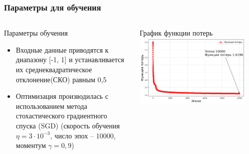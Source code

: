 \begin{frame}[t]
    \frametitle{Параметры для обучения}
    \begin{columns}[T]
    \begin{block}{\centering Параметры обучения}                
        \begin{itemize}\small
            \item Входные данные приводятся к диапазону [-1, 1] и устанавливается их
            среднеквадратическое отклонение(СКО) равным 0,5
            \item Оптимизация производилась с использованием метода стохастического градиентного спуска (SGD)
            (скорость обучения $\eta =3 \cdot 10^{-3}$, число эпох -- 10000, моментум $\gamma = 0,9$)
        \end{itemize}
    \end{block}
     
    \begin{block}{\centering График функции потерь}
        \vspace{3mm}
        \centering \includegraphics[width = 0.9\textwidth]{pics/loss.png} 
    \end{block}
    \end{columns}
    
    \end{frame}
    